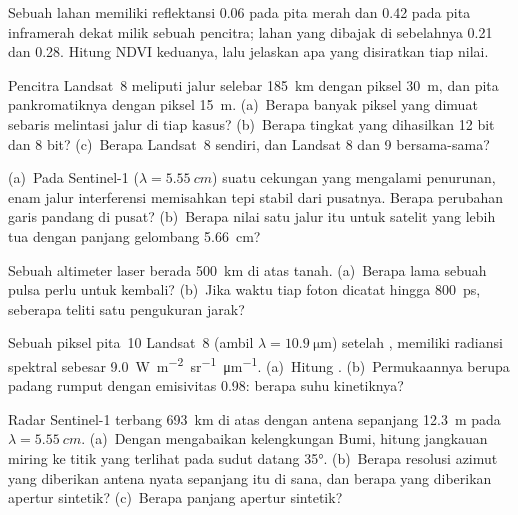 \begin{exercise}[$\star$]\label{exo:b3:remote-sensing-gis:1}
Sebuah lahan memiliki reflektansi 0.06 pada pita merah dan 0.42 pada
pita inframerah dekat milik sebuah pencitra; lahan yang dibajak di sebelahnya 0.21 dan
0.28. Hitung NDVI keduanya, lalu jelaskan apa yang disiratkan tiap nilai.
\end{exercise}

\begin{exercise}[$\star$]\label{exo:b3:remote-sensing-gis:2}
Pencitra Landsat~8 meliputi jalur selebar \qty{185}{km} dengan piksel \qty{30}{m},
dan pita pankromatiknya dengan piksel \qty{15}{m}. (a)~Berapa banyak
piksel yang dimuat sebaris melintasi jalur di tiap kasus? (b)~Berapa tingkat
yang dihasilkan 12 bit dan 8 bit? (c)~Berapa  Landsat~8
sendiri, dan Landsat 8 dan 9 bersama-sama?
\end{exercise}

\begin{exercise}[$\star$]\label{exo:b3:remote-sensing-gis:3}
(a)~Pada  Sentinel-1 ($\lambda = \qty{5.55}{cm}$) suatu
cekungan yang mengalami penurunan, enam jalur interferensi memisahkan tepi stabil dari pusatnya.
Berapa perubahan garis pandang di pusat? (b)~Berapa nilai satu
jalur itu untuk satelit yang lebih tua dengan panjang gelombang \qty{5.66}{cm}?
\end{exercise}

\begin{exercise}[$\star$]\label{exo:b3:remote-sensing-gis:4}
Sebuah altimeter laser berada \qty{500}{km} di atas tanah. (a)~Berapa lama sebuah pulsa
perlu untuk kembali? (b)~Jika waktu tiap foton dicatat hingga \qty{800}{ps}, seberapa
teliti satu pengukuran jarak?
\end{exercise}

\begin{exercise}[$\star\star$]\label{exo:b3:remote-sensing-gis:5}
Sebuah piksel pita~10 Landsat~8 (ambil $\lambda = \qty{10.9}{\micro\metre}$)
setelah , memiliki radiansi spektral sebesar
\qty{9.0}{W.m^{-2}.sr^{-1}.\micro\metre^{-1}}. (a)~Hitung .
(b)~Permukaannya berupa padang rumput dengan emisivitas 0.98: berapa
suhu kinetiknya?
\end{exercise}

\begin{exercise}[$\star\star$]\label{exo:b3:remote-sensing-gis:6}
Radar Sentinel-1 terbang \qty{693}{km} di atas dengan antena sepanjang \qty{12.3}{m}
pada $\lambda = \qty{5.55}{cm}$. (a)~Dengan mengabaikan kelengkungan Bumi, hitung
jangkauan miring ke titik yang terlihat pada sudut datang
\ang{35}. (b)~Berapa resolusi azimut yang diberikan antena nyata sepanjang itu
di sana, dan berapa yang diberikan apertur sintetik? (c)~Berapa panjang
apertur sintetik?
\end{exercise}

